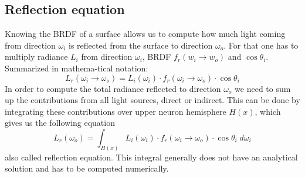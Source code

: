     \subsection{Reflection equation}
    Knowing the BRDF of a surface allows us to compute how much light coming from direction $\omega_i$ is reflected from the surface to direction $\omega_o$. For that one has to multiply radiance $L_i$ from direction $\omega_i$, BRDF $f_r(w_i \to w_o)$ and $\cos \theta_i$. Summarized in mathema-tical notation:
    \begin{equation}
        L_r(\omega_i \to \omega_o) = L_i(\omega_i) \cdot f_r(\omega_i \to \omega_o) \cdot \cos \theta_i
    \end{equation}
    \newline
    In order to compute the total radiance reflected to direction $\omega_o$ we need to sum up the contributions from all light sources, direct or indirect. This can be done by integrating these contributions over upper neuron hemisphere $H(x)$, which gives us the following equation
    \begin{equation}
    \label{eq:reflection-equation}
        L_r(\omega_o) = \int_{H(x)} L_i(\omega_i) \cdot f_r(\omega_i \to \omega_o) \cdot \cos \theta_i \; d\omega_i
    \end{equation}
    also called reflection equation. This integral generally does not have an analytical solution and has to be computed numerically.
